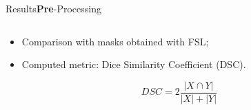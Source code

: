 \documentclass[]{standalone}
\begin{document}
	\begin{frame}{Results}{\textbf{Pre}-Processing}
	\vspace{-28pt}
	
	\begin{columns}
		\begin{column}{0.33\textwidth}
		\begin{itemize}
	
		\item Comparison with masks obtained with FSL;
		\item Computed metric: Dice Similarity Coefficient (DSC).
	\end{itemize}
	
		\begin{equation*}
			    DSC = 2\frac{|X \cap Y |}{|X| + |Y|}
		\end{equation*}
		\end{column}
		

\end{columns}
\end{frame}
\end{document}
